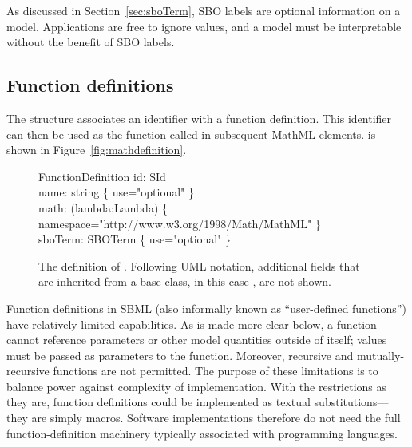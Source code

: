 As discussed in Section~\ref{sec:sboTerm}, SBO labels are optional
information on a model.  Applications are free to ignore
 values, and a model must be interpretable without
the benefit of SBO labels.


\subsection{Function definitions}
\label{sec:functiondefinition}

The \FunctionDefinition structure associates an identifier with a
function definition.  This identifier can then be used as the
function called in subsequent MathML  elements.
\FunctionDefinition is shown in Figure~\ref{fig:mathdefinition}.

\begin{figure}[htb]
  \vspace*{-0.25ex}
  \centering
  \begin{classbox}{FunctionDefinition}
    id: SId                                                                    \\
    name: string \{ use="optional" \}                                          \\
    math: (lambda:Lambda) \{ namespace="http://www.w3.org/1998/Math/MathML" \} \\
    sboTerm: SBOTerm \{ use="optional" \}       \\
  \end{classbox}
  \vspace*{-0.25ex}
  \caption{The definition of \FunctionDefinition.  Following UML notation,
    additional fields
    that are inherited from a base class, in this case \SBase, are not shown.}
  \label{fig:mathdefinition}
  \label{fig:functionDefinition}
\end{figure}

Function definitions in SBML (also informally known as
``user-defined functions'') have relatively limited capabilities.
As is made more clear below, a function cannot reference
parameters or other model quantities outside of itself; values
must be passed as parameters to the function.  Moreover, recursive
and mutually-recursive functions are not permitted.  The purpose
of these limitations is to balance power against complexity of
implementation.  With the restrictions as they are, function
definitions could be implemented as textual substitutions---they
are simply macros.  Software implementations therefore do not need
the full function-definition machinery typically associated with
programming languages.

